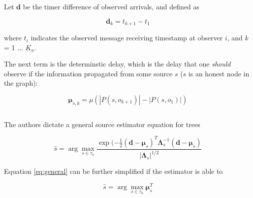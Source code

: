 Let $\boldsymbol{d}$ be the timer difference of observed arrivals, and defined as

\begin{equation}
\boldsymbol{d}_k = t_{k+1} - t_1
\end{equation}

where $t_i$ indicates the observed message receiving timestamp at observer $i$, and $k$ = 1 ... $K_a$.

The next term is the determinstic delay, which is the delay that one \emph{should} observe if the information propagated from some source $s$ ($s$ is an honest node in the graph):

\begin{equation}
\boldsymbol{\mu}_{s,k} = \mu (|P(s, o_{k+1})| - |P(s, o_1)|)
\end{equation}


\begin{equation}
\end{equation}


The authors dictate a general source estimator equation for trees 

\begin{equation}
\label{eq:general}
\hat{s} = \arg\max_{s \in \tau_{a}} \dfrac{\exp(-\frac{1}{2} (\boldsymbol{d} - \boldsymbol{\mu}_{s})^{T} \boldsymbol{\Lambda}_s^{-1} (\boldsymbol{d} - \boldsymbol{\mu}_s) }{|\boldsymbol{\Lambda}_s|^{1/2}}
\end{equation}

Equation \ref{eq:general} can be further simplified if the estimator is able to 

\begin{equation}
\label{eq:tree}
\hat{s} = \arg\max_{s \in \tau_{a}} \boldsymbol{\mu}_{s}^{T}
\end{equation}
